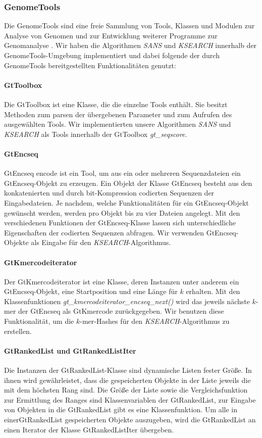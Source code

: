 \documentclass{article}
\begin{document}
\subsubsection{GenomeTools}

Die GenomeTools sind eine freie Sammlung von Tools, Klassen und Modulen zur
Analyse von Genomen und zur Entwicklung weiterer Programme zur Genomanalyse \cite{gtools}. 
Wir haben die Algorithmen \emph{SANS} und \emph{KSEARCH} innerhalb der GenomeTools-Umgebung implementiert und dabei folgende der durch GenomeTools bereitgestellten Funktionalitäten genutzt:

\paragraph{GtToolbox}
Die GtToolbox ist eine Klasse, die die einzelne Tools enthält. Sie besitzt
Methoden zum parsen der übergebenen Parameter und zum Aufrufen des ausgewählten
Tools. Wir implementierten unsere Algorithmen \emph{SANS} und \emph{KSEARCH} als Tools
innerhalb der GtToolbox \emph{gt\_seqscore}. 

\paragraph{GtEncseq}
GtEncseq encode ist ein Tool, um aus ein oder mehreren Sequenzdateien ein
GtEncseq-Objekt zu erzeugen. Ein Objekt der Klasse GtEncseq besteht aus den
konkatenierten und durch bit-Kompression codierten Sequenzen der Eingabedateien.
Je nachdem, welche Funktionalitäten für ein GtEncseq-Objekt gewünscht werden, werden pro Objekt bis zu vier Dateien angelegt. Mit den verschiedenen Funktionen der GtEncseq-Klasse lassen sich unterschiedliche Eigenschaften der codierten Sequenzen abfragen. Wir verwenden GtEncseq-Objekte als Eingabe für den \emph{KSEARCH}-Algorithmus.

\paragraph{GtKmercodeiterator}
Der GtKmercodeiterator ist eine Klasse, deren Instanzen unter anderem ein GtEncseq-Objekt, eine Startposition und eine Länge für $k$ erhalten. Mit den Klassenfunktionen \emph{gt\_kmercodeiterator\_encseq\_next()} wird das jeweils nächste $k$-mer der GtEncseq als GtKmercode zurückgegeben. Wir benutzen diese Funktionalität, um die $k$-mer-Hashes für den \emph{KSEARCH}-Algorithmus zu erstellen.

\paragraph{GtRankedList und GtRankedListIter}
Die Instanzen der GtRankedList-Klasse sind dynamische Listen fester Größe. In ihnen wird gewährleistet, dass die gespeicherten Objekte in der Liste jeweils die mit dem höchsten Rang sind. 
Die Größe der Liste sowie die Vergleichsfunktion zur Ermittlung des Ranges sind Klassenvariablen der GtRankedList, zur Eingabe von Objekten in die GtRankedList gibt es eine Klassenfunktion. 
Um alle in einerGtRankedList gespeicherten Objekte auszugeben, wird die GtRankedList an einen Iterator der Klasse GtRankedListIter übergeben.
\end{document}
